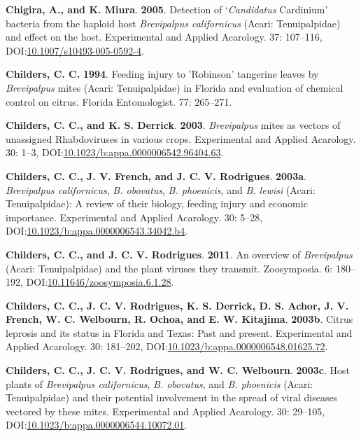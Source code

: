 \documentclass[12pt,final,CPage]{ufthesis}
\newlength{\cslhangindent}
\newenvironment{CSLReferences}[2] %
{%
	\setlength{\parindent}{0pt}
	\ifodd #1 \everypar{\setlength{\hangindent}{\cslhangindent}}\ignorespaces\fi
	\ifnum #2 > 0
	\setlength{\parskip}{#2\baselineskip}
	\fi
}%
{}
\begin{document}
{\begin{CSLReferences}{1}{0}
  \leavevmode{}%
  \textbf{Chigira, A., and K. Miura}. \textbf{2005}. Detection of {`{\emph{Candidatus}} {Cardinium}'} bacteria from the haploid host {\emph{Brevipalpus californicus}} ({Acari}: {Tenuipalpidae}) and effect on the host. Experimental and Applied Acarology. 37: 107--116, DOI:\href{https://doi.org/10.1007/s10493-005-0592-4}{10.1007/s10493-005-0592-4}.

  \leavevmode{}%
  \textbf{Childers, C. C.} \textbf{1994}. Feeding injury to {'Robinson'} tangerine leaves by {\emph{Brevipalpus}} mites ({Acari}: {Tenuipalpidae}) in {Florida} and evaluation of chemical control on citrus. Florida Entomologist. 77: 265--271.

  \leavevmode{}%
  \textbf{Childers, C. C., and K. S. Derrick}. \textbf{2003}. {\emph{Brevipalpus}} mites as vectors of unassigned {Rhabdoviruses} in various crops. Experimental and Applied Acarology. 30: 1--3, DOI:\href{https://doi.org/10.1023/b:appa.0000006542.96404.63}{10.1023/b:appa.0000006542.96404.63}.

  \leavevmode{}%
  \textbf{Childers, C. C., J. V. French, and J. C. V. Rodrigues}. \textbf{2003a}. {\emph{Brevipalpus californicus}}, {\emph{B. obovatus}}, {\emph{B. phoenicis}}, and {\emph{B. lewisi}} ({Acari}: {Tenuipalpidae}): A review of their biology, feeding injury and economic importance. Experimental and Applied Acarology. 30: 5--28, DOI:\href{https://doi.org/10.1023/b:appa.0000006543.34042.b4}{10.1023/b:appa.0000006543.34042.b4}.

  \leavevmode{}%
  \textbf{Childers, C. C., and J. C. V. Rodrigues}. \textbf{2011}. An overview of {\emph{Brevipalpus}} ({Acari}: {Tenuipalpidae}) and the plant viruses they transmit. Zoosymposia. 6: 180--192, DOI:\href{https://doi.org/10.11646/zoosymposia.6.1.28}{10.11646/zoosymposia.6.1.28}.

  \leavevmode{}%
  \textbf{Childers, C. C., J. C. V. Rodrigues, K. S. Derrick, D. S. Achor, J. V. French, W. C. Welbourn, R. Ochoa, and E. W. Kitajima}. \textbf{2003b}. {Citrus leprosis} and its status in {Florida} and {Texas}: Past and present. Experimental and Applied Acarology. 30: 181--202, DOI:\href{https://doi.org/10.1023/b:appa.0000006548.01625.72}{10.1023/b:appa.0000006548.01625.72}.

  \leavevmode{}%
  \textbf{Childers, C. C., J. C. V. Rodrigues, and W. C. Welbourn}. \textbf{2003c}. Host plants of {\emph{Brevipalpus californicus}}, {\emph{B. obovatus}}, and {\emph{B. phoenicis}} ({Acari}: {Tenuipalpidae}) and their potential involvement in the spread of viral diseases vectored by these mites. Experimental and Applied Acarology. 30: 29--105, DOI:\href{https://doi.org/10.1023/b:appa.0000006544.10072.01}{10.1023/b:appa.0000006544.10072.01}.


\end{CSLReferences}}
\end{document}
